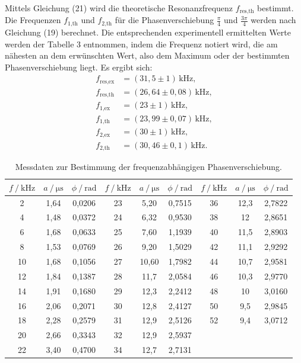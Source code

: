 Mittels Gleichung (21) wird die theoretische Resonanzfrequenz $f_\text{res,th}$ bestimmt. 
Die Frequenzen $f_\text{1,th}$ und $f_\text{2,th}$ für die Phasenverschiebung $\frac{\pi}{4}$
und $\frac{3\pi}{4}$ werden nach Gleichung (19) berechnet. Die entsprechenden experimentell
ermittelten Werte werden der Tabelle 3 entnommen, indem die Frequenz notiert wird,
die am nähesten an dem erwünschten Wert, also dem Maximum oder der bestimmten Phasenverschiebung liegt.
 Es ergibt sich:
\begin{align*}
f_\text{res,ex} &= (31,5 \pm 1)\, \si{\kilo\hertz},\\
f_\text{res,th} &= (26,64 \pm 0,08)\,\si{\kilo\hertz},\\
f_\text{1,ex} &= (23 \pm 1)\,\si{\kilo\hertz},\\
f_\text{1,th} &= (23,99 \pm 0,07)\,\si{\kilo\hertz},\\
f_\text{2,ex} &= (30 \pm 1)\,\si{\kilo\hertz},\\
f_\text{2,th} &= (30,46 \pm 0,1)\,\si{\kilo\hertz}.
\end{align*}

\begin{table}
\centering
\caption{Messdaten zur Bestimmung der frequenzabhängigen Phasenverschiebung.}
\label{tab:some_data}
\begin{tabular}{c c c c c c c c c}
\toprule
$f\:/\:\si{\kilo\hertz}$ & $a\:/\:\si{\micro\second}$ & $\phi\:/\:\text{rad}$ & $f\:/\:\si{\kilo\hertz}$ & $a\:/\:\si{\micro\second}$ & $\phi\:/\:\text{rad}$ & $f\:/\:\si{\kilo\hertz}$ & $a\:/\:\si{\micro\second}$ & $\phi\:/\:\text{rad}$ \\
\midrule
2  & 1,64 & 0,0206  & 23 & 5,20 & 0,7515 & 36 & 12,3 & 2,7822 \\
4  & 1,48  & 0,0372 & 24 & 6,32 & 0,9530 & 38 & 12 &  2,8651 \\
6  & 1,68  & 0,0633 & 25 & 7,60 & 1,1939 & 40 & 11,5 &  2,8903 \\
8  & 1,53  & 0,0769 & 26 & 9,20 & 1,5029 & 42 & 11,1  &  2,9292 \\
10 & 1,68  & 0,1056 & 27 & 10,60 & 1,7982 & 44 & 10,7  &  2,9581 \\
12 & 1,84  & 0,1387 & 28 & 11,7 & 2,0584 & 46 & 10,3  &  2,9770 \\
14 & 1,91  & 0,1680 & 29 & 12,3 & 2,2412 & 48 & 10  &  3,0160 \\
16 & 2,06  & 0,2071 & 30 & 12,8 & 2,4127 & 50 & 9,5  &  2,9845 \\
18 & 2,28  & 0,2579 & 31 & 12,9 & 2,5126 & 52 & 9,4  &  3,0712 \\
20 & 2,66  & 0,3343 & 32 & 12,9 & 2,5937 & & & \\
22 & 3,40  & 0,4700 & 34 & 12,7 & 2,7131 & & & \\
\bottomrule
\end{tabular}
\end{table}

